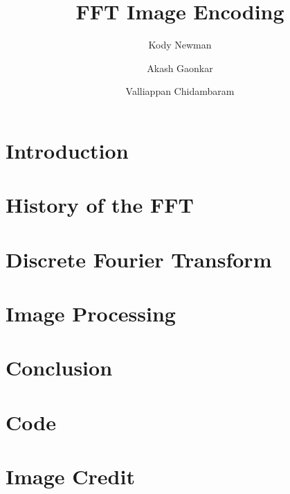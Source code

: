 \documentclass[sigplan]{acmart}
\title{FFT Image Encoding}
\author{Kody Newman}
\author{Akash Gaonkar}
\author{Valliappan Chidambaram}
\begin{document}
  \maketitle

  \section{Introduction}
  \label{sec:introduction}
	

  \section{History of the FFT}
  \label{sec:history}
	

  \section{Discrete Fourier Transform}
  \label{sec:dft}
	

  \section{Image Processing}
  \label{sec:img-processing}
	

  \section{Conclusion}
  \label{sec:conclusion}
	

  \nocite{cooley_tukey_1965, cooley_lewis_welch_1967}
	

	\onecolumn\newpage
	\appendix
  \section{Code}
  \label{sec:code}
	

  \section{Image Credit}
  \label{sec:image-credit}
  
\end{document}
